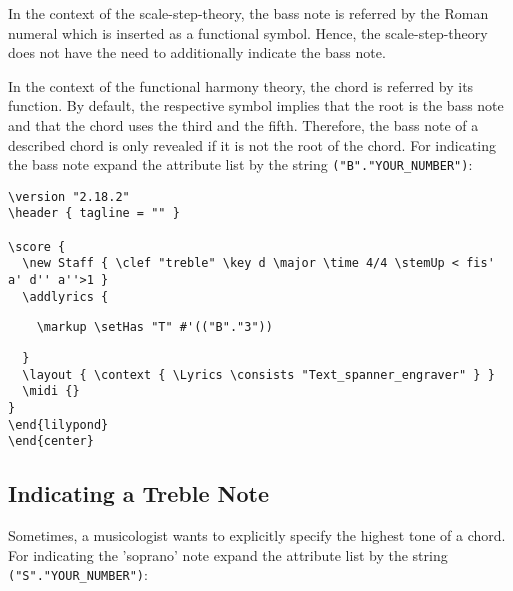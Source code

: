 \documentclass[
  DIV=calc,
  BCOR=5mm,
  12pt,
  headings=small,
  oneside,
  abstract=true,
  toc=bib,
  xcolor=dvipsnames,
  openany,
  ngerman,english]{scrartcl}
\begin{document}
In the context of the scale-step-theory, the bass note is referred by the Roman
numeral which is inserted as a functional symbol. Hence, the  scale-step-theory
does not have the need to additionally indicate the bass note.

In the context of the functional harmony theory, the chord is referred by its
function. By default, the respective symbol implies that the root is the bass
note and that the chord uses the third and the fifth. Therefore, the bass note
of a described chord is only revealed if it is not the root of the chord. For
indicating the bass note expand the attribute list by the
string \texttt{("B"."YOUR\_NUMBER")}:

\begin{center}
\end{center}

\begin{scriptsize}
\begin{verbatim}
\version "2.18.2"
\header { tagline = "" }

\score {
  \new Staff { \clef "treble" \key d \major \time 4/4 \stemUp < fis' a' d'' a''>1 }
  \addlyrics { 
\end{verbatim}
{ \color{red} \verb|    \markup \setHas "T" #'(("B"."3"))| }
\begin{verbatim}    
  }
  \layout { \context { \Lyrics \consists "Text_spanner_engraver" } }
  \midi {}
}
\end{lilypond}
\end{center}
\end{verbatim}
\end{scriptsize}

\subsection{Indicating a Treble Note}

Sometimes, a musicologist wants to explicitly specify the highest tone of a
chord. For indicating the 'soprano' note expand the attribute list by the string
\texttt{("S"."YOUR\_NUMBER")}:
\begin{center}
\end{center}
\end{document}
